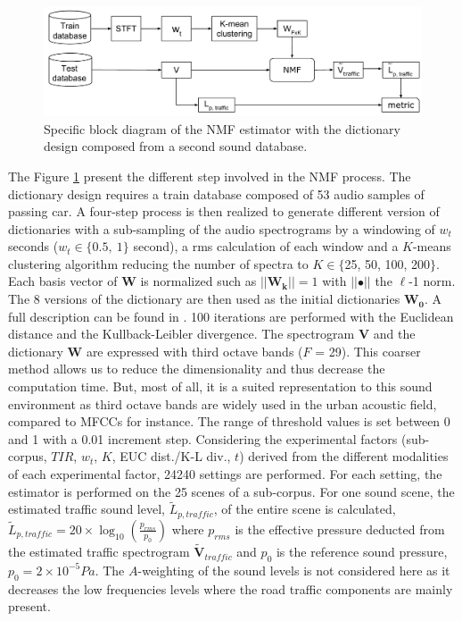 \documentclass[12pt,english,twoside]{article}
\begin{document}
\begin{figure}
    \centering
    \includegraphics[width=.7\linewidth]{./figures/bloc_diagram_complet_NMF_EN.pdf}
    \caption{Specific block diagram of the NMF estimator with the dictionary design composed from a second sound database.}
    \label{fig:bloc_nmf}
\end{figure}

The Figure \ref{fig:bloc_nmf} present the different step involved in the NMF process. 
The dictionary design requires a train database composed of 53 audio samples of passing car. A four-step process is then realized to generate different version of dictionaries with a sub-sampling of the audio spectrograms by a windowing of $w_t$ seconds ($w_t\in \lbrace 0.5,~1\rbrace$ second), a rms calculation of each window and a $K$-means clustering algorithm reducing the number of spectra to $K \in \lbrace$25, 50, 100, 200$\rbrace$. Each basis vector of $\mathbf{W}$ is normalized such as $\vert \vert \mathbf{W_k} \vert \vert = 1$ with $\vert \vert \bullet \vert\vert$ the $\ell$-1 norm. The 8 versions of the dictionary are then used as the initial dictionaries $\mathbf{W_0}$. A full description can be found in \cite{gloaguen2019road}.
100 iterations are performed with the Euclidean distance and the Kullback-Leibler divergence. The spectrogram $\mathbf{V}$ and the dictionary $\mathbf{W}$ are expressed with third octave bands ($F$ = 29). This coarser method allows us to reduce the dimensionality and thus decrease the computation time. But, most of all, it is a suited representation to this sound environment as third octave bands are widely used in the urban acoustic field, compared to MFCCs for instance. The range of threshold values is set between 0 and 1 with a 0.01 increment step. Considering the experimental factors (sub-corpus, $TIR$, $w_t$, $K$, EUC dist./K-L div., $t$) derived from the different modalities of each experimental factor, 24240 settings are performed. For each setting, the estimator is performed on the 25 scenes of a sub-corpus. For one sound scene, the estimated traffic sound level, $\tilde{L}_{p,traffic}$, of the entire scene is calculated, $\tilde{L}_{p,traffic} = 20 \times \log_{10}\left(\frac{p_{rms}}{p_0}\right)$ where $p_{rms}$ is the effective pressure deducted from the estimated traffic spectrogram $\mathbf{\tilde{V}}_{traffic}$ and $p_0$ is the reference sound pressure, $p_0 = 2 \times 10^{-5} Pa$.  The $A$-weighting of the sound levels is not considered here as it decreases the low frequencies levels where the road traffic components are mainly present. 
\end{document}
